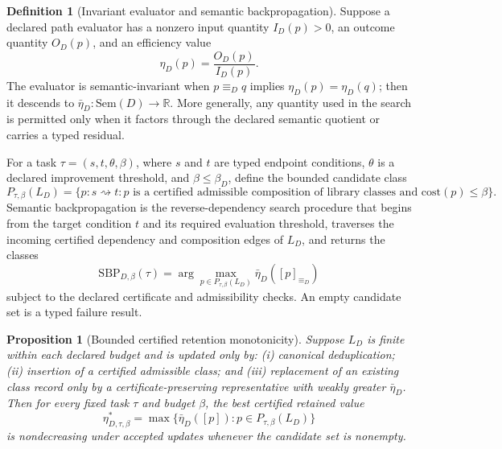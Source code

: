 \documentclass[11pt]{article}
\newtheorem{proposition}{Proposition}
\theoremstyle{definition}
\newtheorem{definition}{Definition}
\begin{document}
\begin{definition}[Invariant evaluator and semantic backpropagation]
Suppose a declared path evaluator has a nonzero input quantity $I_D(p) > 0$, an outcome quantity $O_D(p)$, and an efficiency value
\begin{equation}
\eta_D(p) = \frac{O_D(p)}{I_D(p)}. \tag{S34}
\end{equation}
The evaluator is semantic-invariant when $p \equiv_D q$ implies $\eta_D(p) = \eta_D(q)$; then it descends to $\bar{\eta}_D : \mathrm{Sem}(D) \to \mathbb{R}$. More generally, any quantity used in the search is permitted only when it factors through the declared semantic quotient or carries a typed residual.

For a task $\tau = (s, t, \theta, \beta)$, where $s$ and $t$ are typed endpoint conditions, $\theta$ is a declared improvement threshold, and $\beta \leq \beta_D$, define the bounded candidate class
\begin{equation}
P_{\tau,\beta}(L_D) = \{p : s \rightsquigarrow t : p \text{ is a certified admissible composition of library classes and } \mathrm{cost}(p) \leq \beta\}. \tag{S35}
\end{equation}
Semantic backpropagation is the reverse-dependency search procedure that begins from the target condition $t$ and its required evaluation threshold, traverses the incoming certified dependency and composition edges of $L_D$, and returns the classes
\begin{equation}
\mathrm{SBP}_{D,\beta}(\tau) = \arg\max_{p \in P_{\tau,\beta}(L_D)} \bar{\eta}_D([p]_{\equiv_D}) \tag{S36}
\end{equation}
subject to the declared certificate and admissibility checks. An empty candidate set is a typed failure result.
\end{definition}

\begin{proposition}[Bounded certified retention monotonicity]
Suppose $L_D$ is finite within each declared budget and is updated only by: (i) canonical deduplication; (ii) insertion of a certified admissible class; and (iii) replacement of an existing class record only by a certificate-preserving representative with weakly greater $\bar{\eta}_D$. Then for every fixed task $\tau$ and budget $\beta$, the best certified retained value
\begin{equation}
\eta^{*}_{D,\tau,\beta} = \max\{\bar{\eta}_D([p]) : p \in P_{\tau,\beta}(L_D)\} \tag{S37}
\end{equation}
is nondecreasing under accepted updates whenever the candidate set is nonempty.
\end{proposition}
\end{document}
